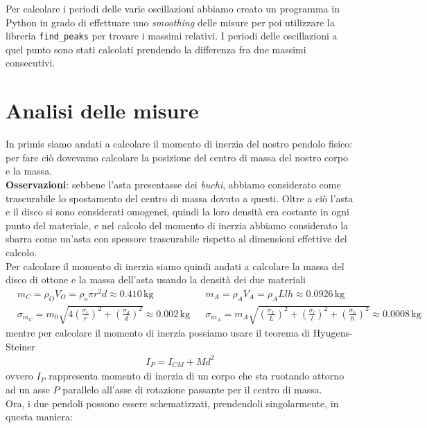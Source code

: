 \documentclass{article}
\begin{document}
Per calcolare i periodi delle varie oscillazioni abbiamo creato un programma in Python in grado di effettuare uno \emph{smoothing} delle misure per poi utilizzare la libreria \texttt{find\_peaks} per trovare i massimi relativi. I periodi delle oscillazioni a quel punto sono stati calcolati prendendo la differenza fra due massimi consecutivi.

\section{Analisi delle misure}

In primis siamo andati a calcolare il momento di inerzia del nostro pendolo fisico: per fare ciò dovevamo calcolare la posizione del centro di massa del nostro corpo e la massa. \\
\textbf{Osservazioni}: sebbene l'asta presentasse dei \emph{buchi}, abbiamo considerato come trascurabile lo spostamento del centro di massa dovuto a questi. Oltre a ciò l'asta e il disco si sono considerati omogenei, quindi la loro densità era costante in ogni punto del materiale, e nel calcolo del momento di inerzia abbiamo considerato la sbarra come un'asta con spessore trascurabile rispetto al dimensioni effettive del calcolo. \\
Per calcolare il momento di inerzia siamo quindi andati a calcolare la massa del disco di ottone e la massa dell'asta usando la densità dei due materiali
\begin{align*}
	&m_C = \rho_O V_O = \rho_o \pi r^2 d \approx 0.410 \, \si{\kilogram} & &m_A = \rho_A V_A = \rho_A Llh \approx 0.0926 \, \si{\kilogram} \\
	&\sigma_{m_C} = m_0 \sqrt{4 \left(\frac{\sigma_r}{r} \right)^2 + \left( \frac{\sigma_d}{d} \right)^2} \approx 0.002 \, \si{\kilogram} & &\sigma_{m_A} = m_A \sqrt{ \left(\frac{\sigma_L}{L} \right)^2 + \left( \frac{\sigma_l}{l} \right)^2 + \left( \frac{\sigma_h}{h} \right)^2} \approx 0.0008 \, \si{\kilogram}
\end{align*}
mentre per calcolare il momento di inerzia possiamo usare il teorema di Hyugens-Steiner
\begin{align*}
	I_P = I_{CM} + Md^2
\end{align*}
ovvero $I_P$ rappresenta momento di inerzia di un corpo che sta ruotando attorno ad un asse $P$ parallelo all'asse di rotazione passante per il centro di massa. \\
Ora, i due pendoli possono essere schematizzati, prendendoli singolarmente, in questa maniera:
\end{document}
